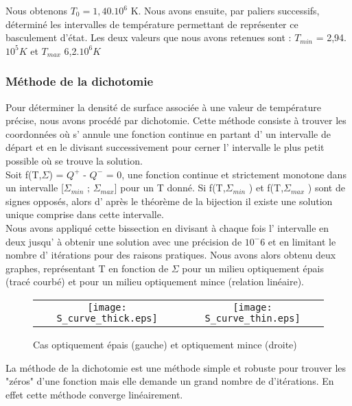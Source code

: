 Nous obtenons $T_0 =1,40.10^6$ K. Nous avons ensuite, par paliers successifs, déterminé les intervalles de température permettant de représenter ce basculement d'état. Les deux valeurs que nous avons retenues sont : $T_{min}$ = 2,94.$10^5 K$ et $T_{max}$ 6,2.$10^6 K$ 
\\


\subsubsection{Méthode de la dichotomie}

Pour déterminer la densité de surface associée à une valeur de température précise, nous avons procédé par dichotomie.
Cette méthode consiste à trouver les coordonnées où s' annule une fonction continue en partant d' un intervalle de départ et en le divisant successivement pour cerner l' intervalle le plus petit possible où se trouve la solution.  
\\
Soit f(T,$\Sigma$) = $Q^+$ - $Q^-$ = 0,  une fonction continue et strictement monotone dans un intervalle [$\Sigma_{min}$ ; $\Sigma_{max}$] pour un T donné. Si f(T,$\Sigma_{min}$ ) et  f(T,$\Sigma_{max}$ ) sont de signes opposés, alors d' après le théorème de la bijection il existe une solution unique comprise dans cette intervalle. 
\\
Nous avons appliqué cette bissection en divisant à chaque fois l' intervalle en deux jusqu' à obtenir une solution avec une précision de $10^-6$ et en limitant le nombre d' itérations pour des raisons pratiques. Nous avons alors obtenu deux graphes, représentant T en fonction de $\Sigma$ pour un milieu optiquement épais (tracé courbé) et pour un milieu optiquement mince (relation linéaire).
\\

\begin{figure}[htb!]
\centering
\begin{tabular}{cc} 
\texttt{[image: S\_curve\_thick.eps]} &
\texttt{[image: S\_curve\_thin.eps]} \\
\end{tabular}
  \caption{Cas optiquement épais (gauche) et optiquement mince (droite)}
\label{Fig::}
\end{figure}

La méthode de la dichotomie est une méthode simple et robuste pour trouver les "zéros" d'une fonction mais elle demande un grand nombre de d'itérations. En effet cette méthode converge linéairement.

